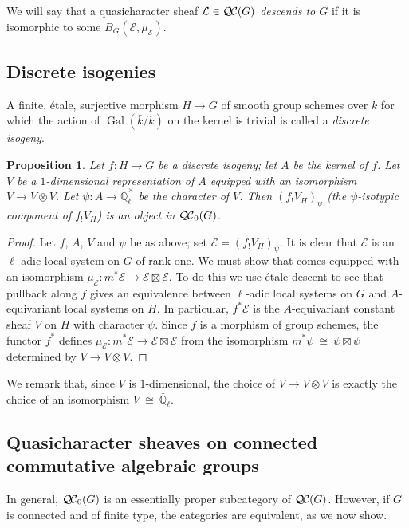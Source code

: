 \documentclass{amsart}
\theoremstyle{plain}
\newtheorem{proposition}[theorem]{Proposition}
\theoremstyle{definition}
\theoremstyle{remark}
\newcommand{\EE}{\mathbb{\bar Q}_\ell}
\newcommand{\bFq}{\bar{k}}
\newcommand{\Fq}{k}
\newcommand{\EEx}{\EE^\times}
\DeclareMathOperator{\Gal}{Gal}
\newcommand{\iso}{{\ \cong\ }}
\newcommand{\qcs}[1]{{\mathcal{#1}}}
\newcommand{\QC}{{\mathcal{Q\hskip-0.8pt C}}}
\newcommand{\bQC}{{\QC_0}}
\begin{document}
We will say that a quasicharacter sheaf $\qcs{L} \in \QC(G)$ \emph{descends to $G$} if it is isomorphic to some $B_G(\qcs{E}, \mu_\qcs{E})$.

\subsection{Discrete isogenies}\label{ssec:discrete_isogenies}

A finite, étale, surjective morphism $H\to G$ of smooth group schemes over $\Fq$ for which the action of $\Gal(\bFq/\Fq)$ on the kernel is trivial is called a {\it discrete isogeny}.

\begin{proposition}\label{prop:finite}
Let $f: H \to G$ be a discrete isogeny; let $A$ be the kernel of $f$.
Let $V$ be a $1$-dimensional representation of $A$ 
equipped with an isomorphism $V\to V\otimes V$.
Let $\psi : A \to \EEx$ be the character of $V$.
Then $(f_! V_H)_\psi$ (the $\psi$-isotypic component of $f_!V_H$) is an object in $\bQC(G)$.
\end{proposition}

\begin{proof}
Let $f$, $A$, $V$ and $\psi$ be as above; set $\qcs{E} = (f_! V_H)_\psi$.
It is clear that $\qcs{E}$ is an $\ell$-adic local system on $G$ of rank one.
We must show that comes equipped with an isomorphism $\mu_\qcs{E} : m^* \qcs{E} \to \qcs{E}\boxtimes\qcs{E}$.
To do this we use étale descent to see that pullback along $f$ gives an equivalence between $\ell$-adic local systems on $G$ and $A$-equivariant local systems on $H$. 
In particular, $f^*\qcs{E}$ is the $A$-equivariant constant sheaf $V$ on $H$ with character $\psi$.
Since $f$ is a morphism of group schemes, the functor $f^*$ defines $\mu_\qcs{E} : m^*\qcs{E} \to \qcs{E}\boxtimes\qcs{E}$
from the isomorphism $m^*\psi \iso \psi \boxtimes\psi$ determined by $V\to V\otimes V$.
\end{proof}

We remark that, since $V$ is $1$-dimensional, the choice of $V \to V\otimes V$ is exactly the choice of an isomorphism $V\iso \EE$.

\subsection{Quasicharacter sheaves on connected commutative algebraic groups}\label{ssec:connected}

In general, $\bQC(G)$ is an essentially
proper subcategory of $\QC(G)$. 
However, if $G$ is connected and of finite type, the categories are equivalent, as we now show.
\end{document}
